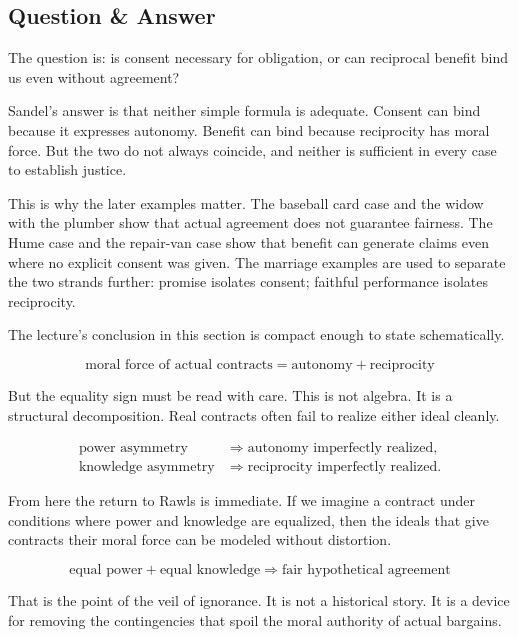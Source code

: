 \subsection{Question \& Answer}

The question is: is consent necessary for obligation, or can reciprocal benefit bind us even without agreement?

Sandel's answer is that neither simple formula is adequate. Consent can bind because it expresses autonomy. Benefit can bind because reciprocity has moral force. But the two do not always coincide, and neither is sufficient in every case to establish justice.

This is why the later examples matter. The baseball card case and the widow with the plumber show that actual agreement does not guarantee fairness. The Hume case and the repair-van case show that benefit can generate claims even where no explicit consent was given. The marriage examples are used to separate the two strands further: promise isolates consent; faithful performance isolates reciprocity.

The lecture's conclusion in this section is compact enough to state schematically.

\begin{equation}
\text{moral force of actual contracts} = \text{autonomy} + \text{reciprocity}
\end{equation}

But the equality sign must be read with care. This is not algebra. It is a structural decomposition. Real contracts often fail to realize either ideal cleanly.

\begin{align}
\text{power asymmetry} &\Longrightarrow \text{autonomy imperfectly realized}, \\
\text{knowledge asymmetry} &\Longrightarrow \text{reciprocity imperfectly realized}.
\end{align}

From here the return to Rawls is immediate. If we imagine a contract under conditions where power and knowledge are equalized, then the ideals that give contracts their moral force can be modeled without distortion.

\begin{equation}
\text{equal power} + \text{equal knowledge} \Longrightarrow \text{fair hypothetical agreement}
\end{equation}

That is the point of the veil of ignorance. It is not a historical story. It is a device for removing the contingencies that spoil the moral authority of actual bargains.

